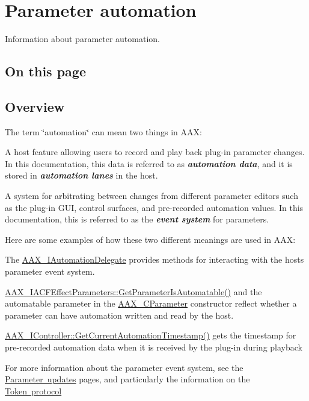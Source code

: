 \hypertarget{a00819}{}\section{Parameter automation}
\label{a00819}
Information about parameter automation. 

\hypertarget{a00819_parameterAutomation_contents}{}\subsection{On this page}\label{a00819_parameterAutomation_contents}
 \hypertarget{a00819_parameterAutomation_overview}{}\subsection{Overview}\label{a00819_parameterAutomation_overview}
 The term \char`\"{}automation\char`\"{} can mean two things in A\+AX\+: 
\begin{DoxyEnumerate}
\item A host feature allowing users to record and play back plug-\/in parameter changes. In this documentation, this data is referred to as {\itshape {\bfseries{automation data}}}, and it is stored in {\itshape {\bfseries{automation lanes}}} in the host.  
\item A system for arbitrating between changes from different parameter editors such as the plug-\/in G\+UI, control surfaces, and pre-\/recorded automation values. In this documentation, this is referred to as the {\itshape {\bfseries{event system}}} for parameters.  
\end{DoxyEnumerate}

 Here are some examples of how these two different meanings are used in A\+AX\+: \begin{DoxyItemize}
\item The \mbox{\hyperlink{a01773}{A\+A\+X\+\_\+\+I\+Automation\+Delegate}} provides methods for interacting with the host\textquotesingle{}s parameter event system. \item \mbox{\hyperlink{a01669_a4e6eeef25a797ea4c6961df45174b169}{A\+A\+X\+\_\+\+I\+A\+C\+F\+Effect\+Parameters\+::\+Get\+Parameter\+Is\+Automatable()}} and the {\ttfamily automatable} parameter in the \mbox{\hyperlink{a01537}{A\+A\+X\+\_\+\+C\+Parameter}} constructor reflect whether a parameter can have automation written and read by the host. \item \mbox{\hyperlink{a01789_af9ab9b228023e116f89249a56c27a20f}{A\+A\+X\+\_\+\+I\+Controller\+::\+Get\+Current\+Automation\+Timestamp()}} gets the timestamp for pre-\/recorded automation data when it is received by the plug-\/in during playback\end{DoxyItemize}
For more information about the parameter event system, see the \mbox{\hyperlink{a00820}{Parameter updates}} pages, and particularly the information on the \mbox{\hyperlink{a00822}{Token protocol}} 

